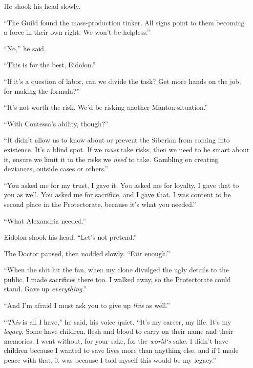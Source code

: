 He shook his head slowly.



``The Guild found the mass-production tinker.  All signs point to them becoming a force in their own right.  We won't be helpless.''



``No,'' he said.



``This is for the best, Eidolon.''



``If it's a question of labor, can we divide the task?  Get more hands on the job, for making the formula?''



``It's not worth the risk.  We'd be risking another Manton situation.''



``With Contessa's ability, though?''



``It didn't allow us to know about or prevent the Siberian from coming into existence.  It's a blind spot\emph{.  }If we \emph{must} take risks, then we need to be smart about it, ensure we limit it to the risks we \emph{need} to take.  Gambling on creating deviances, outside cases or others.''



``You asked me for my trust, I gave it.  You asked me for loyalty, I gave that to you as well.  You asked me for sacrifice, and I gave that.  I was content to be second place in the Protectorate, because it's what you needed.''



``What Alexandria needed.''



Eidolon shook his head.  ``Let's not pretend.''



The Doctor paused, then nodded slowly.  ``Fair enough.''



``When the shit hit the fan, when my clone divulged the ugly details to the public, I made sacrifices there too.  I walked away, so the Protectorate could stand.  Gave up \emph{everything}.''



``And I'm afraid I must ask you to give up \emph{this} as well.''



``\emph{This} is all I have,'' he said, his voice quiet.  ``It's my career, my life.  It's my \emph{legacy}.  Some have children, flesh and blood to carry on their name and their memories.  I went without, for your sake, for the \emph{world}\emph{`s }sake.  I didn't have children because I wanted to save lives more than anything else, and if I made peace with that, it was because I told myself this would be my legacy.''



